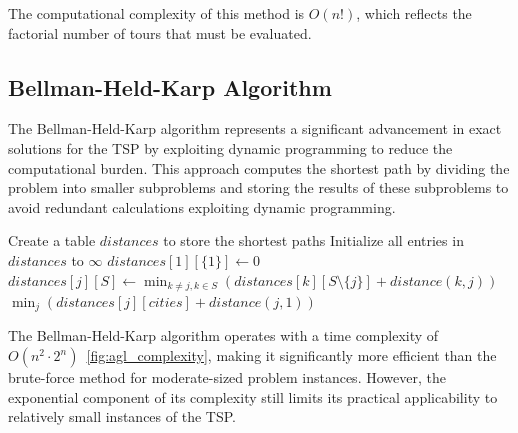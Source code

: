 The computational complexity of this method is $O(n!)$, which reflects the factorial number of tours that must be evaluated.

\subsection{Bellman-Held-Karp Algorithm}

The Bellman-Held-Karp algorithm represents a significant advancement in exact solutions for the \Gls{TSP} by exploiting dynamic programming to reduce the computational burden. This approach computes the shortest path by dividing the problem into smaller subproblems and storing the results of these subproblems to avoid redundant calculations exploiting dynamic programming.

\begin{algorithm}
	\caption{Bellman-Held-Karp Algorithm}\label{bellmanheldkarp}
	\begin{algorithmic}[1]
		\State Create a table $distances$ to store the shortest paths
		\State Initialize all entries in $distances$ to $\infty$
		\State $distances[1][\{1\}] \gets 0$ 
		\State $distances[j][S] \gets \min_{k \neq j, k \in S} (distances[k][S\setminus\{j\}] + distance(k, j))$
		\EndFor
		\EndFor
		\EndFor
		\State \Return $\min_{j}(distances[j][cities] + distance(j, 1))$
		\EndProcedure
	\end{algorithmic}
\end{algorithm}

The Bellman-Held-Karp algorithm operates with a time complexity of $O(n^2 \cdot 2^n)$~\ref{fig:agl_complexity}, making it significantly more efficient than the brute-force method for moderate-sized problem instances. However, the exponential component of its complexity still limits its practical applicability to relatively small instances of the \Gls{TSP}.



